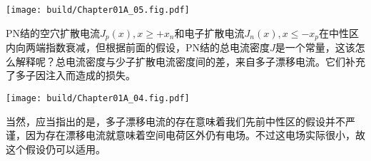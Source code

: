 \begin{Figure}
    \texttt{[image: build/Chapter01A\_05.fig.pdf]}
\end{Figure}

PN结的空穴扩散电流$J_p(x), x\geq +x_n$和电子扩散电流$J_n(x), x\leq -x_p$在中性区内向两端指数衰减，但根据前面的假设，PN结的总电流密度$J$是一个常量，这该怎么解释呢？总电流密度与少子扩散电流密度间的差，来自多子漂移电流。它们补充了多子因注入而造成的损失。

\begin{Figure}[PN结的电流密度分布]
    \texttt{[image: build/Chapter01A\_04.fig.pdf]}
\end{Figure}

当然，应当指出的是，多子漂移电流的存在意味着我们先前中性区的假设并不严谨，因为存在漂移电流就意味着空间电荷区外仍有电场。不过这电场实际很小，故这个假设仍可以适用。
